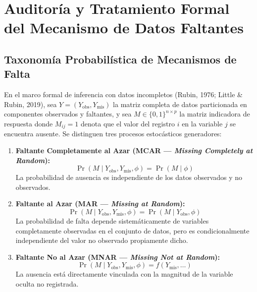 \documentclass[11pt,letterpaper]{article}
\begin{document}
\section{Auditoría y Tratamiento Formal del Mecanismo de Datos Faltantes}

\subsection{Taxonomía Probabilística de Mecanismos de Falta}
En el marco formal de inferencia con datos incompletos (Rubin, 1976; Little \& Rubin, 2019), sea $Y = (Y_{\text{obs}}, Y_{\text{mis}})$ la matriz completa de datos particionada en componentes observados y faltantes, y sea $M \in \{0, 1\}^{n \times p}$ la matriz indicadora de respuesta donde $M_{ij} = 1$ denota que el valor del registro $i$ en la variable $j$ se encuentra ausente. Se distinguen tres procesos estocásticos generadores:

\begin{enumerate}
    \item \textbf{Faltante Completamente al Azar (MCAR — \textit{Missing Completely at Random}):}
    \begin{equation}
        \Pr(M \mid Y_{\text{obs}}, Y_{\text{mis}}, \phi) = \Pr(M \mid \phi)
    \end{equation}
    La probabilidad de ausencia es independiente de los datos observados y no observados.
    \item \textbf{Faltante al Azar (MAR — \textit{Missing at Random}):}
    \begin{equation}
        \Pr(M \mid Y_{\text{obs}}, Y_{\text{mis}}, \phi) = \Pr(M \mid Y_{\text{obs}}, \phi)
    \end{equation}
    La probabilidad de falta depende sistemáticamente de variables completamente observadas en el conjunto de datos, pero es condicionalmente independiente del valor no observado propiamente dicho.
    \item \textbf{Faltante No al Azar (MNAR — \textit{Missing Not at Random}):}
    \begin{equation}
        \Pr(M \mid Y_{\text{obs}}, Y_{\text{mis}}, \phi) = f(Y_{\text{mis}}, \dots)
    \end{equation}
    La ausencia está directamente vinculada con la magnitud de la variable oculta no registrada.
\end{enumerate}
\end{document}
